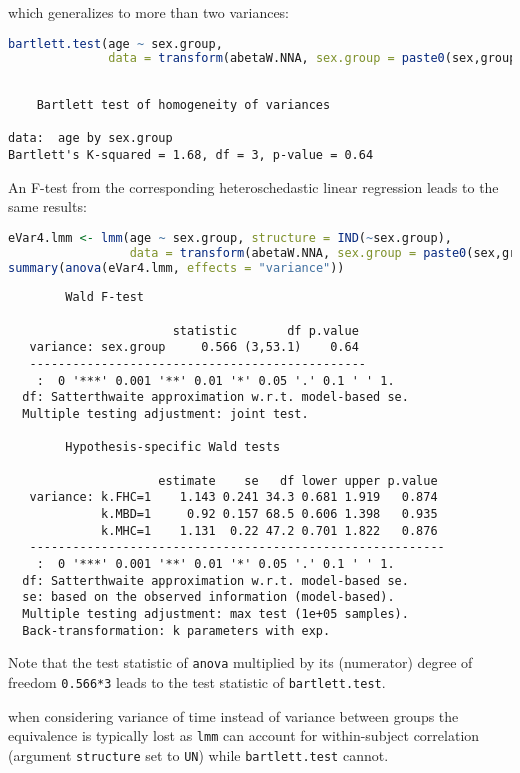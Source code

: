 \documentclass[12pt]{article}
\newcommand\Warning[1][3ex]{%
\renewcommand\stacktype{L}%
\scaleto{\stackon[1.3pt]{\color{red}$\triangle$}{\tiny\bfseries !}}{#1}%
\xspace
}
\begin{document}
which generalizes to more than two variances:
\begin{lstlisting}[language=r,numbers=none]
bartlett.test(age ~ sex.group,
              data = transform(abetaW.NNA, sex.group = paste0(sex,group)))
\end{lstlisting}

\label{}
\begin{verbatim}

	Bartlett test of homogeneity of variances

data:  age by sex.group
Bartlett's K-squared = 1.68, df = 3, p-value = 0.64
\end{verbatim}


An F-test from the corresponding heteroschedastic linear regression
leads to the same results:
\begin{lstlisting}[language=r,numbers=none]
eVar4.lmm <- lmm(age ~ sex.group, structure = IND(~sex.group),
                 data = transform(abetaW.NNA, sex.group = paste0(sex,group)))
summary(anova(eVar4.lmm, effects = "variance"))
\end{lstlisting}

\label{}
\begin{verbatim}
		Wald F-test 

                       statistic       df p.value  
   variance: sex.group     0.566 (3,53.1)    0.64  
   ----------------------------------------------- 
    :  0 '***' 0.001 '**' 0.01 '*' 0.05 '.' 0.1 ' ' 1.
  df: Satterthwaite approximation w.r.t. model-based se. 
  Multiple testing adjustment: joint test.

		Hypothesis-specific Wald tests 

                     estimate    se   df lower upper p.value  
   variance: k.FHC=1    1.143 0.241 34.3 0.681 1.919   0.874  
             k.MBD=1     0.92 0.157 68.5 0.606 1.398   0.935  
             k.MHC=1    1.131  0.22 47.2 0.701 1.822   0.876  
   ---------------------------------------------------------- 
    :  0 '***' 0.001 '**' 0.01 '*' 0.05 '.' 0.1 ' ' 1.
  df: Satterthwaite approximation w.r.t. model-based se. 
  se: based on the observed information (model-based). 
  Multiple testing adjustment: max test (1e+05 samples).
  Back-transformation: k parameters with exp.
\end{verbatim}

Note that the test statistic of \texttt{anova} multiplied by its (numerator)
degree of freedom \texttt{0.566*3} leads to the test statistic of
\texttt{bartlett.test}. \newline \Warning when considering variance of time
instead of variance between groups the equivalence is typically lost
as \texttt{lmm} can account for within-subject correlation (argument
\texttt{structure} set to \texttt{UN}) while \texttt{bartlett.test} cannot.
\end{document}
